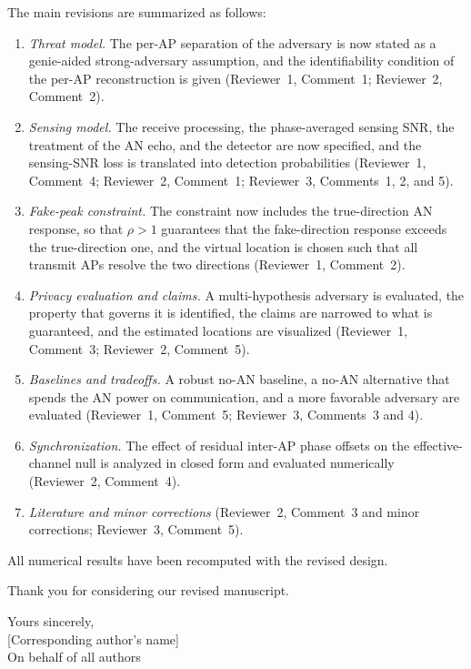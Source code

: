 \documentclass[a4paper,12pt]{article}
\newcommand{\authorName}{[Corresponding author's name]}
\newcounter{reviewcomment}
\newcommand{\reviewer}[1]{%
  \clearpage
  \setcounter{reviewcomment}{0}%
  {\color{blue}\large\bfseries Comments by #1\par}
  {\color{blue}\rule{\linewidth}{0.15em}}\par
}
\newenvironment{reviewcomment}{%
  \stepcounter{reviewcomment}%
  \begin{shaded}
  \textbf{Comment \thereviewcomment:}\par
}{\end{shaded}}
\newenvironment{response}{\par\textbf{Response:}\par}{\par}
\newcommand{\revisionlocation}[1]{\par\textbf{Location in the revised manuscript:} #1\par}
\begin{document}
The main revisions are summarized as follows:
\begin{enumerate}
  \item \emph{Threat model.} The per-AP separation of the adversary is now
  stated as a genie-aided strong-adversary assumption, and the
  identifiability condition of the per-AP reconstruction is given
  (Reviewer~1, Comment~1; Reviewer~2, Comment~2).
  \item \emph{Sensing model.} The receive processing, the phase-averaged
  sensing SNR, the treatment of the AN echo, and the detector are now
  specified, and the sensing-SNR loss is translated into detection
  probabilities (Reviewer~1, Comment~4; Reviewer~2, Comment~1; Reviewer~3,
  Comments~1, 2, and 5).
  \item \emph{Fake-peak constraint.} The constraint now includes the
  true-direction AN response, so that $\rho>1$ guarantees that the
  fake-direction response exceeds the true-direction one, and the virtual
  location is chosen such that all transmit APs resolve the two directions
  (Reviewer~1, Comment~2).
  \item \emph{Privacy evaluation and claims.} A multi-hypothesis adversary
  is evaluated, the property that governs it is identified, the claims are
  narrowed to what is guaranteed, and the estimated locations are
  visualized (Reviewer~1, Comment~3; Reviewer~2, Comment~5).
  \item \emph{Baselines and tradeoffs.} A robust no-AN baseline, a no-AN
  alternative that spends the AN power on communication, and a more
  favorable adversary are evaluated (Reviewer~1, Comment~5; Reviewer~3,
  Comments~3 and 4).
  \item \emph{Synchronization.} The effect of residual inter-AP phase
  offsets on the effective-channel null is analyzed in closed form and
  evaluated numerically (Reviewer~2, Comment~4).
  \item \emph{Literature and minor corrections} (Reviewer~2, Comment~3 and
  minor corrections; Reviewer~3, Comment~5).
\end{enumerate}
All numerical results have been recomputed with the revised design.

Thank you for considering our revised manuscript.

\vspace{1cm}
Yours sincerely,\\[0.5em]
\authorName\\
On behalf of all authors

\end{document}
